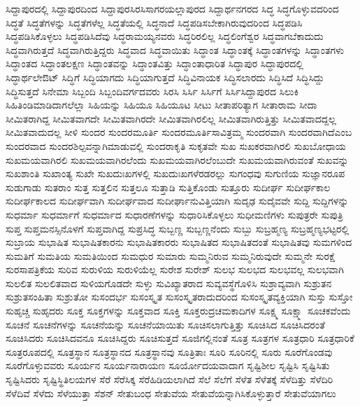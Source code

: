 {ಸಿದ್ದಾಪುರದಲ್ಲಿ
ಸಿದ್ದಾಪುರದಿಂದ
ಸಿದ್ದಾಪುರಸಿರಸಿಸಾಗರಯಲ್ಲಾಪುರದ
ಸಿದ್ದಾರ್ಥನಗರದ
ಸಿದ್ಧ
ಸಿದ್ಧಗೊಳ್ಳುವದರಿಂದ
ಸಿದ್ಧತೆ
ಸಿದ್ಧತೆಗಳನ್ನು
ಸಿದ್ಧತೆಗಳೆಲ್ಲ
ಸಿದ್ಧತೆಯಲ್ಲಿ
ಸಿದ್ಧನಾದೆ
ಸಿದ್ಧಪಡಿಸಬೇಕಾಗಿರುವುದರಿಂದ
ಸಿದ್ಧಪಡಿಸಿ
ಸಿದ್ಧಪಡಿಸಿಕೊಳ್ಳಲು
ಸಿದ್ಧಪಡಿಸಿದೆವು
ಸಿದ್ಧರಾಮಯ್ಯನವರು
ಸಿದ್ಧರಿರಲಿಲ್ಲ
ಸಿದ್ಧಲಿಂಗೆಶ್ವರ
ಸಿದ್ಧವಾಗಬೆಕಾದುದು
ಸಿದ್ಧವಾಗಿರುತ್ತದೆ
ಸಿದ್ಧವಾಗಿರುತ್ತಿದ್ದರು
ಸಿದ್ಧವಾದ
ಸಿದ್ಧವಾಯಿತು
ಸಿದ್ಧಾಂತ
ಸಿದ್ಧಾಂತಕ್ಕೆ
ಸಿದ್ಧಾಂತಗಳನ್ನು
ಸಿದ್ಧಾಂತಗಳು
ಸಿದ್ಧಾಂತದ
ಸಿದ್ಧಾಂತಲಕ್ಷಣ
ಸಿದ್ಧಾಂತವನ್ನು
ಸಿದ್ಧಾಂತವಿತ್ತು
ಸಿದ್ಧಾಂತಾಧಾರಿತ
ಸಿದ್ಧಾಪುರ
ಸಿದ್ಧಾಪುರದಲ್ಲಿ
ಸಿದ್ಧಾರ್ಥಲೇಔಟ್
ಸಿದ್ಧಿಗೆ
ಸಿದ್ಧಿಯಾಗದು
ಸಿದ್ಧಿಯಾಗುತ್ತದೆ
ಸಿದ್ಧಿವಿನಾಯಕ
ಸಿದ್ಧಿಸಲಾರದು
ಸಿದ್ಧಿಸಿದೆ
ಸಿದ್ಧಿಸಿದ್ದು
ಸಿದ್ಧಿಸುತ್ತದೆ
ಸಿನೇಮಾ
ಸಿಬ್ಬಂದಿ
ಸಿಬ್ಬಂದಿವರ್ಗದವರು
ಸಿರಸಿ
ಸಿರ್ಸಿ
ಸಿರ್ಸಿಗೆ
ಸಿರ್ಸಿಸಿದ್ದಾಪುರದ
ಸಿಲುಕಿ
ಸಿಹಿತಿಂಡಿಮಾಡಿದಾಗಲೆಲ್ಲಾ
ಸಿಹಿಯನ್ನು
ಸಿಹಿಯೂ
ಸಿಹಿಯೂಟ
ಸೀಟು
ಸೀತಾಪರಿತ್ಯಾಗ
ಸೀತಾರಾಮ
ಸೀದಾ
ಸೀಮಿತರಾಗಿದ್ದ
ಸೀಮಿತವಾಗದೇ
ಸೀಮಿತವಾಗಿರದೇ
ಸೀಮಿತವಾಗಿರಲಿಲ್ಲ
ಸೀಮಿತವಾಗಿರುತ್ತಿತ್ತು
ಸೀಮಿತವಾದದ್ದಲ್ಲ
ಸೀಮಿತವಾದುದಲ್ಲ
ಸೀಳಿ
ಸುಂದರ
ಸುಂದರಮೂರ್ತಿ
ಸುಂದರಮೂರ್ತಿಸಾವಿತ್ರಮ್ಮ
ಸುಂದರವಾಗಿ
ಸುಂದರವಾಗಿದೆಎಂಬ
ಸುಂದರವಾದ
ಸುಂದರಶಿಲ್ಪವನ್ನಾಗಿಮಾಡುವಲ್ಲಿ
ಸುಂದರಾಕೃತಿ
ಸುಕೃತವೇ
ಸುಖ
ಸುಖಕರವಾಗಿರಲಿ
ಸುಖಬೋಧಾಯ
ಸುಖಮಯವಾಗಿರಲಿ
ಸುಖಮಯವಾಗಿರಲೆಂದು
ಸುಖಮಯವಾಗಿರಲೆಂಬುದೇ
ಸುಖಮಯವಾಗಿರುವಂತೆ
ಸುಖವನ್ನು
ಸುಖಶಾಂತಿ
ಸುಖಾಂತ್ಯ
ಸುಖೇ
ಸುಖದುಃಖಗಳಲ್ಲಿ
ಸುಖದುಃಖಗಳೆರಡರಲ್ಲು
ಸುಗಂಧವು
ಸುಗುಣಿಯ
ಸುಜ್ಞಾನರೂಪ
ಸುಡುಗಾಡು
ಸುತರಾಂ
ಸುತ್ತ
ಸುತ್ತಲಿನ
ಸುತ್ತಲೂ
ಸುತ್ತಾಡಿ
ಸುತ್ತಿಕೊಂಡು
ಸುತ್ತೂರು
ಸುದೀರ್ಘ
ಸುದೀರ್ಘಕಾಲ
ಸುದೀರ್ಘಕಾಲದ
ಸುದೀರ್ಘವಾಗಿ
ಸುದೀರ್ಘವಾದ
ಸುದೀರ್ಘಾನುವಿತ್ತಿಯಾಗಿ
ಸುದೃಢ
ಸುದೈವವೇ
ಸುದ್ದಿ
ಸುದ್ದಿಗಳನ್ನು
ಸುಧರ್ಮಾ
ಸುಧರ್ಮಾಗೆ
ಸುಧರ್ಮಾದ
ಸುಧಾರಣೆಗಳನ್ನು
ಸುಧಾರಿಸಿಕೊಳ್ಳಲು
ಸುಧೀಮಣಿಗಳು
ಸುಪುತ್ರರೇ
ಸುಪುತ್ರಿ
ಸುಪ್ತ
ಸುಪ್ತಮನಸ್ಸಿನೊಳಗೆ
ಸುಪ್ತವಾಗಿದ್ದ
ಸುಪ್ರಸಿದ್ಧ
ಸುಬ್ಬಣ್ಣ
ಸುಬ್ಬಣ್ಣನೆಂದು
ಸುಬ್ಬು
ಸುಬ್ರಹ್ಮಣ್ಯ
ಸುಬ್ರಹ್ಮಣ್ಯಭಟ್ಟರಲ್ಲಿ
ಸುಬ್ರಾಯ
ಸುಭಾಷಿತ
ಸುಭಾಷಿತಕಾರನು
ಸುಭಾಷಿತಕಾರರು
ಸುಭಾಷಿತದ
ಸುಭಾಷಿತದಂತೆ
ಸುಭಾಷಿತವು
ಸುಮಗಳಿಂದ
ಸುಮತಿಗೆ
ಸುಮತಿಯ
ಸುಮತಿಯಿಂದ
ಸುಮಧುರ
ಸುಮಾರು
ಸುಮ್ಮನಿರುವ
ಸುಮ್ಮನಿರುವುದೇ
ಸುಮ್ಮನೇ
ಸುರಕ್ಷೆ
ಸುರಸಾಪತ್ರಿಕೆಯ
ಸುರಿವ
ಸುರುಳಿಯ
ಸುರುಳಿಯೆಲ್ಲ
ಸುರೇಶ
ಸುರೇಶ್
ಸುಲಭ
ಸುಲಭದ
ಸುಲಭವಲ್ಲ
ಸುಲಭವಾಗಿ
ಸುಲಲಿತ
ಸುಲಲಿತವಾದ
ಸುಳಿಯಗೊಡದೇ
ಸುಳ್ಳು
ಸುವಿಖ್ಯಾತರಾದ
ಸುವ್ಯವಸ್ಥೆಗೊಳಿಸಿ
ಸುಶ್ರಾವ್ಯವಾಗಿ
ಸುಶ್ರುತನ
ಸುಶ್ರುತಸಂಹಿತಾ
ಸುಶ್ರುತೋ
ಸುಸಂದರ್ಭ
ಸುಸಂಸ್ಕೃತ
ಸುಸಂಸ್ಕೃತರಾದುದರಿಂದ
ಸುಸಂಸ್ಕೃತವ್ಯಕ್ತಿಯಾಗಿ
ಸುಸ್ತು
ಸುಸ್ತೋ
ಸುಹೃಚ್ಚ
ಸುಹೃದರು
ಸೂಕ್ತ
ಸೂಕ್ತಗಳನ್ನು
ಸೂಕ್ತವಾದ
ಸೂಕ್ತಿ
ಸೂಕ್ತರುದ್ರಚಮಕಾದಿಗಳ
ಸೂಕ್ಷ್ಮ
ಸೂಕ್ಷ್ಮಾ
ಸೂಚಕವೆಂದು
ಸೂಚನೆ
ಸೂಚನೆಗಳನ್ನು
ಸೂಚನೆಯನ್ನು
ಸೂಚನೆಯಾಯಿತು
ಸೂಚಿಸಲಾಗುತ್ತಿತ್ತು
ಸೂಚಿಸಿದ
ಸೂಚಿಸಿದರಂತೆ
ಸೂಚಿಸಿದರು
ಸೂಚಿಸಿದವನೂ
ಸೂಚಿಸಿದ್ದರು
ಸೂಚಿಸುತ್ತದೆ
ಸೂಜಿಗಲ್ಲಿನಂತೆ
ಸೂತ್ರ
ಸೂತ್ರಗಳ
ಸೂತ್ರಧಾರಿ
ಸೂತ್ರಧಾರಿಕೆ
ಸೂತ್ರರೂಪದಲ್ಲಿ
ಸೂತ್ರಸ್ಥಾನ
ಸೂತ್ರಸ್ಥಾನದ
ಸೂತ್ರಸ್ಥಾನವು
ಸೂತ್ರಿತಾಃ
ಸೂರಿ
ಸೂರಿನಲ್ಲಿ
ಸೂರು
ಸೂರೆಗೊಂಡವು
ಸೂರೆಗೊಳ್ಳುವವರು
ಸೂರ್ಯನ
ಸೂರ್ಯನಾರಾಯಣ
ಸೂರ್ಯೋದಯವಾದಾಗ
ಸೃಷ್ಟಿಶೀಲ
ಸೃಷ್ಟಿಸಿ
ಸೃಷ್ಟಿಸಿತು
ಸೃಷ್ಟಿಸಿದರು
ಸೃಷ್ಟಿಸ್ಥಿತಿಲಯಗಳ
ಸೆರೆ
ಸೆರೆಸಿಕ್ಕ
ಸೆರೆಹಿಡಿಯಲಾಗಿದೆ
ಸೆಲೆ
ಸೆಲೆಗೆ
ಸೆಳೆತ
ಸೆಳೆತಕ್ಕೆ
ಸೆಳೆದಿತ್ತು
ಸೆಳೆದಿರಿ
ಸೆಳೆದಿವೆ
ಸೆಳೆದು
ಸೆಳೆಯುತ್ತಾ
ಸೆಶನ್
ಸೇತುಬಂಧ
ಸೇತುವೆಯ
ಸೇತುವೆಯನ್ನಾಗಿಸಿಕೊಳ್ಳುತ್ತಾರೆ
ಸೇತುವೆಯಾಗಲು
}
